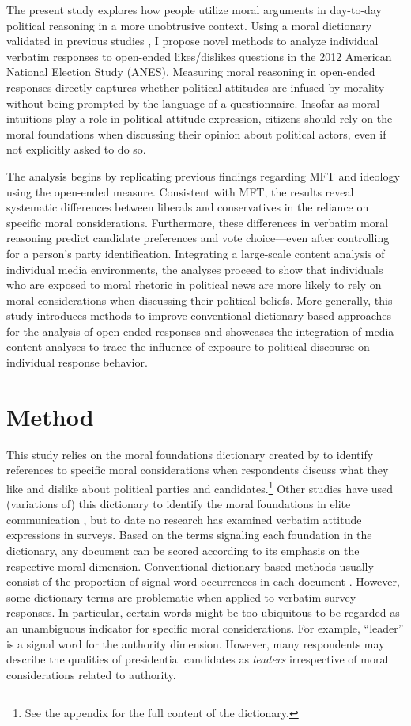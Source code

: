 \documentclass[12pt]{article}
\begin{document}
The present study explores how people utilize moral arguments in day-to-day political reasoning in a more unobtrusive context. Using a moral dictionary validated in previous studies \citep[e.g.,][]{graham2009liberals}, I propose novel methods to analyze individual verbatim responses to open-ended likes/dislikes questions in the 2012 American National Election Study (ANES). Measuring moral reasoning in open-ended responses directly captures whether political attitudes are infused by morality without being prompted by the language of a questionnaire. Insofar as moral intuitions play a role in political attitude expression, citizens should rely on the moral foundations when discussing their opinion about political actors, even if not explicitly asked to do so.

The analysis begins by replicating previous findings regarding MFT and ideology using the open-ended measure. Consistent with MFT, the results reveal systematic differences between liberals and conservatives in the reliance on specific moral considerations. Furthermore, these differences in verbatim moral reasoning predict candidate preferences and vote choice---even after controlling for a person's party identification. Integrating a large-scale content analysis of individual media environments, the analyses proceed to show that individuals who are exposed to moral rhetoric in political news are more likely to rely on moral considerations when discussing their political beliefs. More generally, this study introduces methods to improve conventional dictionary-based approaches for the analysis of open-ended responses and showcases the integration of media content analyses to trace the influence of exposure to political discourse on individual response behavior.


\section*{Method}

This study relies on the moral foundations dictionary created by \citet{graham2009liberals} to identify references to specific moral considerations when respondents discuss what they like and dislike about political parties and candidates.\footnote{See the appendix for the full content of the dictionary.} Other studies have used (variations of) this dictionary to identify the moral foundations in elite communication \citep[e.g.][]{clifford2015concerns}, but to date no research has examined verbatim attitude expressions in surveys. Based on the terms signaling each foundation in the dictionary, any document can be scored according to its emphasis on the respective moral dimension. Conventional dictionary-based methods usually consist of the proportion of signal word occurrences in each document \citep[e.g.][]{graham2009liberals}. However, some dictionary terms are problematic when applied to verbatim survey responses. In particular, certain words might be too ubiquitous to be regarded as an unambiguous indicator for specific moral considerations. For example, ``leader'' is a signal word for the authority dimension. However, many respondents may describe the qualities of presidential candidates as \textit{leaders} irrespective of moral considerations related to authority.
\end{document}
